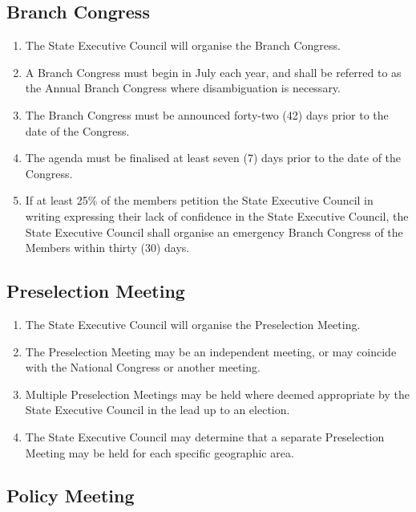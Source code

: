 \documentclass[a4paper,titlepage,8.5pt]{article}
\newcommand{\stateorterritory}{State}
\begin{document}
\subsection{Branch Congress}

\begin{enumerate}
\item The {\stateorterritory} Executive Council will organise the Branch Congress.
\item A Branch Congress must begin in July each year, and shall be referred to as the Annual Branch Congress where disambiguation is necessary.
\item The Branch Congress must be announced forty-two (42) days prior to the date of the Congress.
\item The agenda must be finalised at least seven (7) days prior to the date of the Congress.
\item If at least 25\% of the members petition the {\stateorterritory} Executive Council in writing expressing their lack of confidence in the {\stateorterritory} Executive Council, the {\stateorterritory} Executive Council shall organise an emergency Branch Congress of the Members within thirty (30) days.
\end{enumerate}

\subsection{Preselection Meeting}

\begin{enumerate}
\item The {\stateorterritory} Executive Council will organise the Preselection Meeting.
\item The Preselection Meeting may be an independent meeting, or may coincide with the National Congress or another meeting.
\item Multiple Preselection Meetings may be held where deemed appropriate by the {\stateorterritory} Executive Council in the lead up to an election.
\item The {\stateorterritory} Executive Council may determine that a separate Preselection Meeting may be held for each specific geographic area.
\end{enumerate}

\subsection{Policy Meeting}
\end{document}
